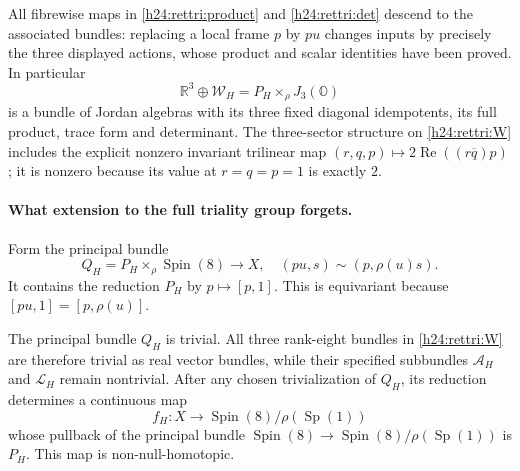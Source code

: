 All fibrewise maps in \eqref{h24:rettri:product} and
\eqref{h24:rettri:det} descend to the associated bundles: replacing
a local frame $p$ by $p u$ changes inputs by precisely the three
displayed actions, whose product and scalar identities have been
proved. In particular
\[
 \mathbb R^3\oplus\mathcal W_H
       =P_H\times_\rho J_3(\mathbb O)
\]
is a bundle of Jordan algebras with its three fixed diagonal
idempotents, its full product, trace form and determinant. The
three-sector structure on \eqref{h24:rettri:W} includes the
explicit nonzero invariant trilinear map
$(r,q,p)\mapsto2\operatorname{Re}((r\overline q)p)$;
it is nonzero because its value at $r=q=p=1$ is exactly $2$.

\paragraph{What extension to the full triality group forgets.}
Form the principal bundle
\begin{equation}
 Q_H=P_H\times_\rho\operatorname{Spin}(8)\longrightarrow X,
 \quad (p u,s)\sim(p,\rho(u)s).
 \label{h24:rettri:Q}
\end{equation}
It contains the reduction $P_H$ by $p\mapsto[p,1]$. This is
equivariant because $[p u,1]=[p,\rho(u)]$.

\begin{proposition}
\label{h24:rettri:forgetting}
The principal bundle $Q_H$ is trivial. All three rank-eight
bundles in \eqref{h24:rettri:W} are therefore trivial as real
vector bundles, while their specified subbundles
$\mathcal A_H$ and $\mathcal L_H$ remain nontrivial.
After any chosen trivialization of $Q_H$, its reduction determines
a continuous map
\begin{equation}
 f_H:X\longrightarrow\operatorname{Spin}(8)/\rho(\operatorname{Sp}(1))
 \label{h24:rettri:reductionmap}
\end{equation}
whose pullback of the principal bundle
$\operatorname{Spin}(8)\to\operatorname{Spin}(8)/\rho(\operatorname{Sp}(1))$
is $P_H$. This map is non-null-homotopic.
\end{proposition}

